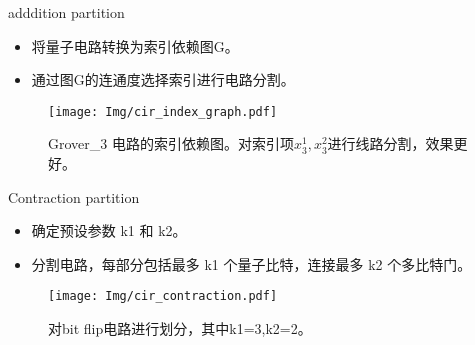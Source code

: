 \documentclass[aspectratio=1610]{ctexbeamer}
\begin{document}
\begin{frame}{adddition partition}
    \begin{itemize}
        \item 将量子电路转换为索引依赖图G。
        \item 通过图G的连通度选择索引进行电路分割。
    \end{itemize}
    \begin{figure}
        \centering
        \texttt{[image: Img/cir\_index\_graph.pdf]}
        \caption{Grover\_3 电路的索引依赖图。对索引项$x_3^1,x_3^2$进行线路分割，效果更好。}
    \end{figure}
\end{frame}
\begin{frame}{Contraction partition}
    \begin{itemize}
        \item 确定预设参数 k1 和 k2。
        \item 分割电路，每部分包括最多 k1 个量子比特，连接最多 k2 个多比特门。
    \end{itemize}
    \begin{figure}
        \centering
        \texttt{[image: Img/cir\_contraction.pdf]}
        \caption{对bit flip电路进行划分，其中k1=3,k2=2。}
    \end{figure}
\end{frame}
\end{document}
